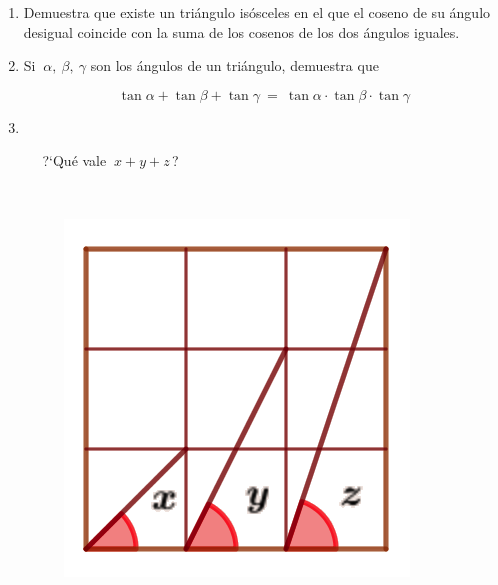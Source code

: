 \begin{enumerate}
\item	Demuestra que existe un triángulo isósceles en el que el coseno de su ángulo desigual coincide con la suma de los cosenos de los dos ángulos iguales.

\vspace{-6mm}
\begin{flushright}
\begin{footnotesize} \textcolor{gris}{}	\end{footnotesize}
\end{flushright}


\item	Si $\ \alpha,\ \beta,\ \gamma $ son los ángulos de un triángulo, demuestra que 

$$ \tan \alpha + \tan \beta + \tan \gamma\ = \ \tan \alpha \cdot \tan \beta \cdot \tan \gamma  $$

\vspace{-8mm}
\begin{flushright}
\begin{footnotesize} \textcolor{gris}{}	\end{footnotesize}
\end{flushright}




\item	
\begin{multicols}{2}
$\quad$ 

$\quad$ ?`Qué vale $\ x+y+z\, $?

$\quad$
\begin{figure}[H]
	\centering
	\includegraphics[width=.2\textwidth]{img-ft/ft10.png}
	\end{figure}
\end{multicols}


\vspace{-6mm}
\begin{flushright}
\begin{footnotesize} \textcolor{gris}{}	\end{footnotesize}
\end{flushright}



\end{enumerate}

